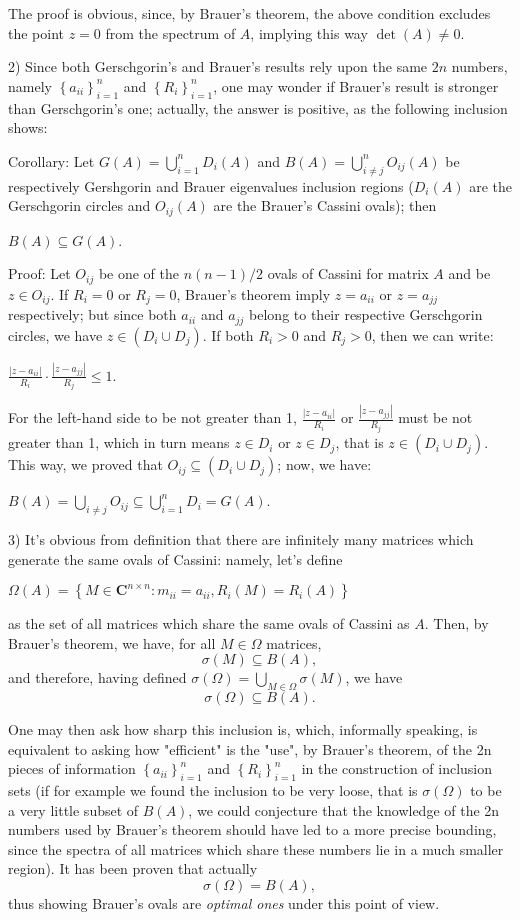 \documentclass[12pt]{article}
\begin{document}
The proof is obvious, since, by Brauer's theorem, the above condition excludes the point $z=0$ from the spectrum of $A$, implying this way $\det(A)\ne 0$.

2) Since both Gerschgorin's and Brauer's results rely upon the same $2n$ numbers, namely $\left\{a_{ii}\right\}_{i=1}^n$ and $\left\{R_i\right\}_{i=1}^n$, one may wonder if Brauer's result is stronger than Gerschgorin's one; actually, the answer is positive, as the following inclusion shows:

Corollary: Let $G(A)=\bigcup_{i=1}^n D_i(A)$ and $B(A)=\bigcup_{i\ne j}^n O_{ij}(A)$ be respectively Gershgorin and Brauer eigenvalues inclusion regions ($D_i(A)$ are the Gerschgorin circles and $O_{ij}(A)$ are the Brauer's Cassini ovals); then

$B(A)\subseteq G(A)$.

Proof:
Let $O_{ij}$ be one of the $n(n-1)/2$ ovals of Cassini for matrix $A$ and be $z\in O_{ij}$. If $R_i=0$ or $R_j=0$, Brauer's theorem imply $z=a_{ii}$ or $z=a_{jj}$ respectively; but since both $a_{ii}$ and $a_{jj}$ belong to their respective Gerschgorin circles, we have $z\in(D_i\cup D_j)$. If both $R_i>0$ and $R_j>0$, then we can write:

$\frac{\left|z-a_{ii}\right|}{R_i}\cdot\frac{\left|z-a_{jj}\right|}{R_j}\leq 1.$

For the left-hand side to be not greater than 1, $\frac{\left|z-a_{ii}\right|}{R_i}$ or $\frac{\left|z-a_{jj}\right|}{R_j}$ must be not greater than 1, which in turn means $z\in D_i$ or $z\in D_j$, that is $z\in(D_i\cup D_j)$. This way, we proved that $O_{ij}\subseteq(D_i\cup D_j)$; now, we have:

$B(A)=\bigcup_{i\ne j}O_{ij}\subseteq\bigcup_{i=1}^n D_i=G(A)$.


3) It's obvious from definition that there are infinitely many matrices which generate the same ovals of Cassini: namely, let's define

$\Omega(A)=\left\{M\in\mathbf{C}^{n\times n}: m_{ii}=a_{ii}, R_i(M)=R_i(A)\right\}$

as the set of all matrices which share the same ovals of Cassini as $A$. Then, by Brauer's theorem, we have, for all $M\in\Omega$ matrices,
\[
\sigma(M)\subseteq B(A),
\]
and therefore, having defined $\sigma(\Omega)=\bigcup_{M\in\Omega}\sigma(M)$, we have
\[
\sigma(\Omega)\subseteq B(A).
\]

One may then ask how sharp this inclusion is, which, informally speaking, is equivalent to asking how "efficient" is the "use", by Brauer's theorem, of the 2n pieces of information $\left\{a_{ii}\right\}_{i=1}^n$ and $\left\{R_i\right\}_{i=1}^n$ in the construction of inclusion sets (if for example we found the inclusion to be very loose, that is $\sigma(\Omega)$ to be a very little subset of $B(A)$, we could conjecture that the knowledge of the 2n numbers used by Brauer's theorem should have led to a more precise bounding, since the spectra of all matrices which share these numbers lie in a much smaller region). It has been proven that actually
\[
\sigma(\Omega)=B(A),
\]
thus showing Brauer's ovals are \emph{optimal ones} under this point of view. 
\end{document}
